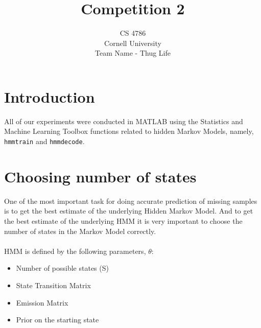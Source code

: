 \documentclass[12pt]{article}
\title{Competition 2}
\author{CS 4786\\
Cornell University\\
Team Name - Thug Life}
\begin{document}
\maketitle
\setlength{\parindent}{0pt}

\section*{Introduction}


All of our experiments were conducted in MATLAB using the Statistics and Machine Learning Toolbox functions related to hidden Markov Models, namely, \verb|hmmtrain| and \verb|hmmdecode|. 

\section*{Choosing number of states}
One of the most important task for doing accurate prediction of missing samples is to get the best estimate of the underlying Hidden Markov Model. And to get the best estimate of the underlying HMM it is very important to choose the number of states in the Markov Model correctly. \\ 
\\
HMM is defined by the following parameters, $\theta$:
\begin{itemize}
    \item Number of possible states (S)
    \item State Transition Matrix
    \item Emission Matrix
    \item Prior on the starting state
\end{itemize}
\end{document}
